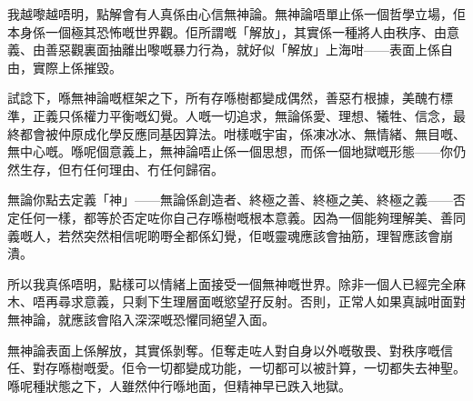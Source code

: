我越嚟越唔明，點解會有人真係由心信無神論。無神論唔單止係一個哲學立場，佢本身係一個極其恐怖嘅世界觀。佢所謂嘅「解放」，其實係一種將人由秩序、由意義、由善惡觀裏面抽離出嚟嘅暴力行為，就好似「解放」上海咁——表面上係自由，實際上係摧毀。

試諗下，喺無神論嘅框架之下，所有存喺樹都變成偶然，善惡冇根據，美醜冇標準，正義只係權力平衡嘅幻覺。人嘅一切追求，無論係愛、理想、犧牲、信念，最終都會被仲原成化學反應同基因算法。咁樣嘅宇宙，係凍冰冰、無情緒、無目嘅、無中心嘅。喺呢個意義上，無神論唔止係一個思想，而係一個地獄嘅形態——你仍然生存，但冇任何理由、冇任何歸宿。

無論你點去定義「神」——無論係創造者、終極之善、終極之美、終極之義——否定任何一樣，都等於否定咗你自己存喺樹嘅根本意義。因為一個能夠理解美、善同義嘅人，若然突然相信呢啲嘢全都係幻覺，佢嘅靈魂應該會抽筋，理智應該會崩潰。

所以我真係唔明，點樣可以情緒上面接受一個無神嘅世界。除非一個人已經完全麻木、唔再尋求意義，只剩下生理層面嘅慾望孖反射。否則，正常人如果真誠咁面對無神論，就應該會陷入深深嘅恐懼同絕望入面。

無神論表面上係解放，其實係剝奪。佢奪走咗人對自身以外嘅敬畏、對秩序嘅信任、對存喺樹嘅愛。佢令一切都變成功能，一切都可以被計算，一切都失去神聖。喺呢種狀態之下，人雖然仲行喺地面，但精神早已跌入地獄。
